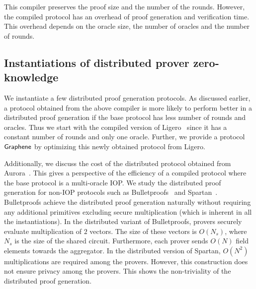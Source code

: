 This compiler preserves the proof size and the number of the rounds. However, the compiled protocol has an overhead of proof generation and verification time. This overhead depends on the oracle size, the number of oracles and the number of rounds. 

\subsection{Instantiations of distributed prover zero-knowledge}
We instantiate a few distributed proof generation protocols. As discussed earlier, a protocol obtained from the above compiler is more likely to perform better in a distributed proof generation if the base protocol has less number of rounds and oracles. Thus we start with the compiled version of Ligero~\cite{ligero} since it has a constant number of rounds and only one oracle. Further, we provide a protocol $\textsf{Graphene}$ by optimizing this newly obtained protocol from Ligero.

Additionally, we discuss the cost of the distributed protocol obtained from Aurora~\cite{aurora}. This gives a perspective of the efficiency of a compiled protocol where the base protocol is a multi-oracle IOP.
We study the distributed proof generation for non-IOP protocols such as Bulletproofs~\cite{bulletproofs} and Spartan~\cite{spartan}. Bulletproofs achieve the distributed proof generation naturally without requiring any additional primitives excluding secure multiplication (which is inherent in all the instantiations).   In the distributed variant of Bulletproofs, provers securely evaluate multiplication of $2$ vectors. The size of these vectors is $O(N_s)$, where $N_s$ is the size of the shared circuit. Furthermore, each prover sends $O(N)$ field elements towards the aggregator. In the distributed version of Spartan, $O(N^2)$ multiplications are required among the provers. However, this construction does not ensure privacy among the provers. This shows the non-triviality of the distributed proof generation. 
 

